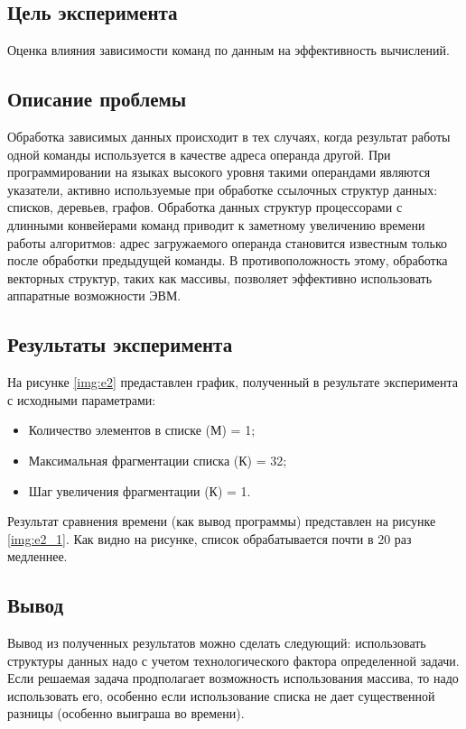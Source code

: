 \subsection*{Цель эксперимента}
Оценка влияния зависимости команд по данным на эффективность вычислений. 

\subsection*{Описание проблемы}
Обработка зависимых данных происходит в тех случаях, когда результат работы одной команды используется в качестве адреса операнда другой. При программировании на языках высокого уровня такими операндами являются указатели, активно используемые при обработке ссылочных структур данных: списков, деревьев, графов. Обработка данных структур процессорами с длинными конвейерами команд приводит к заметному увеличению времени работы алгоритмов: адрес загружаемого операнда становится известным только после обработки предыдущей команды. В противоположность этому, обработка векторных структур, таких как массивы, позволяет эффективно использовать аппаратные возможности ЭВМ. 

\subsection*{Результаты эксперимента}
На рисунке \ref{img:e2} предаставлен график, полученный в результате эксперимента с исходными параметрами:
\begin{itemize}
	\item Количество элементов в списке (М) = 1;
	\item Максимальная фрагментации списка (К) = 32;
	\item Шаг увеличения фрагментации (К) = 1.
\end{itemize}

\newpage

Результат сравнения времени (как вывод программы) представлен на рисунке \ref{img:e2_1}. Как видно на рисунке, список обрабатывается почти в 20 раз медленнее. 


\subsection*{Вывод}
Вывод из полученных результатов можно сделать следующий: использовать структуры данных надо с учетом технологического фактора определенной задачи. Если решаемая задача продполагает возможность использования массива, то надо использовать его, особенно если использование списка не дает существенной разницы (особенно выиграша во времени).



